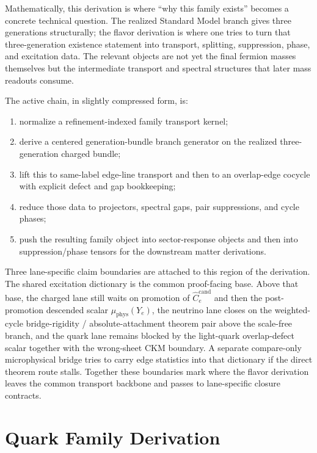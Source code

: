 \documentclass[11pt]{article}
\begin{document}
Mathematically, this derivation is where ``why this family exists'' becomes a concrete technical
question. The realized Standard Model branch gives three generations structurally; the flavor
derivation is where one tries to turn that three-generation existence statement into transport,
splitting, suppression, phase, and excitation data. The relevant objects are not yet the final
fermion masses themselves but the intermediate transport and spectral structures that later mass
readouts consume.

The active chain, in slightly compressed form, is:
\begin{enumerate}[leftmargin=2em]
\item normalize a refinement-indexed family transport kernel;
\item derive a centered generation-bundle branch generator on the realized three-generation
charged bundle;
\item lift this to same-label edge-line transport and then to an overlap-edge cocycle with
explicit defect and gap bookkeeping;
\item reduce those data to projectors, spectral gaps, pair suppressions, and cycle phases;
\item push the resulting family object into sector-response objects and then into
suppression/phase tensors for the downstream matter derivations.
\end{enumerate}

Three lane-specific claim boundaries are attached to this region of the derivation. The shared
excitation dictionary is the common proof-facing base. Above that base, the charged lane still
waits on promotion of \(\widehat C_e^{\mathrm{cand}}\) and then the post-promotion descended
scalar \(\mu_{\mathrm{phys}}(Y_e)\), the neutrino lane closes on the weighted-cycle
bridge-rigidity / absolute-attachment theorem pair above the scale-free branch, and the quark
lane remains blocked by the light-quark overlap-defect scalar together with the wrong-sheet CKM
boundary. A separate compare-only microphysical bridge tries to carry edge statistics into that
dictionary if the direct theorem route stalls. Together these boundaries mark where the flavor
derivation leaves the common transport backbone and passes to lane-specific closure contracts.

\section{Quark Family Derivation}
\end{document}
